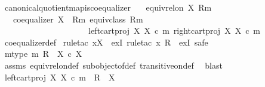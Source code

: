 \begin{isabellebody}
%
\endisadelimproof
\isanewline
{}\isamarkupfalse%
\ canonical{\isacharunderscore}{\kern0pt}quotient{\isacharunderscore}{\kern0pt}map{\isacharunderscore}{\kern0pt}is{\isacharunderscore}{\kern0pt}coequalizer{\isacharcolon}{\kern0pt}\isanewline
\ \ \ {\isachardoublequoteopen}equiv{\isacharunderscore}{\kern0pt}rel{\isacharunderscore}{\kern0pt}on\ X\ {\isacharparenleft}{\kern0pt}R{\isacharcomma}{\kern0pt}m{\isacharparenright}{\kern0pt}{\isachardoublequoteclose}\isanewline
\ \ \ {\isachardoublequoteopen}coequalizer\ {\isacharparenleft}{\kern0pt}X\ {\isasymsslash}\ {\isacharparenleft}{\kern0pt}R{\isacharcomma}{\kern0pt}m{\isacharparenright}{\kern0pt}{\isacharparenright}{\kern0pt}\ {\isacharparenleft}{\kern0pt}equiv{\isacharunderscore}{\kern0pt}class\ {\isacharparenleft}{\kern0pt}R{\isacharcomma}{\kern0pt}m{\isacharparenright}{\kern0pt}{\isacharparenright}{\kern0pt}\isanewline
\ \ \ \ \ \ \ \ \ \ \ \ \ \ \ \ \ \ \ \ \ {\isacharparenleft}{\kern0pt}left{\isacharunderscore}{\kern0pt}cart{\isacharunderscore}{\kern0pt}proj\ X\ X\ {\isasymcirc}\isactrlsub c\ m{\isacharparenright}{\kern0pt}\ {\isacharparenleft}{\kern0pt}right{\isacharunderscore}{\kern0pt}cart{\isacharunderscore}{\kern0pt}proj\ X\ X\ {\isasymcirc}\isactrlsub c\ m{\isacharparenright}{\kern0pt}{\isachardoublequoteclose}\isanewline
%
\isadelimproof
\ \ %
\endisadelimproof
%
\isatagproof
{}\isamarkupfalse%
\ coequalizer{\isacharunderscore}{\kern0pt}def\ \isanewline
{}\isamarkupfalse%
{\isacharparenleft}{\kern0pt}rule{\isacharunderscore}{\kern0pt}tac\ x{\isacharequal}{\kern0pt}X\ \ exI{\isacharcomma}{\kern0pt}\ rule{\isacharunderscore}{\kern0pt}tac\ x{\isacharequal}{\kern0pt}\ R\ \ exI{\isacharcomma}{\kern0pt}\ safe{\isacharparenright}{\kern0pt}\isanewline
\ \ \isamarkupfalse%
\ m{\isacharunderscore}{\kern0pt}type{\isacharcolon}{\kern0pt}\ {\isachardoublequoteopen}m{\isacharcolon}{\kern0pt}\ R\ {\isasymrightarrow}\ X\ {\isasymtimes}\isactrlsub c\ X{\isachardoublequoteclose}\isanewline
\ \ \ \ \isamarkupfalse%
\ assms\ equiv{\isacharunderscore}{\kern0pt}rel{\isacharunderscore}{\kern0pt}on{\isacharunderscore}{\kern0pt}def\ subobject{\isacharunderscore}{\kern0pt}of{\isacharunderscore}{\kern0pt}def{}\ transitive{\isacharunderscore}{\kern0pt}on{\isacharunderscore}{\kern0pt}def\ \isamarkupfalse%
\ blast\isanewline
\ \ \isamarkupfalse%
\ {\isachardoublequoteopen}left{\isacharunderscore}{\kern0pt}cart{\isacharunderscore}{\kern0pt}proj\ X\ X\ {\isasymcirc}\isactrlsub c\ m\ {\isacharcolon}{\kern0pt}\ R\ {\isasymrightarrow}\ X{\isachardoublequoteclose}\isanewline

\end{isabellebody}
